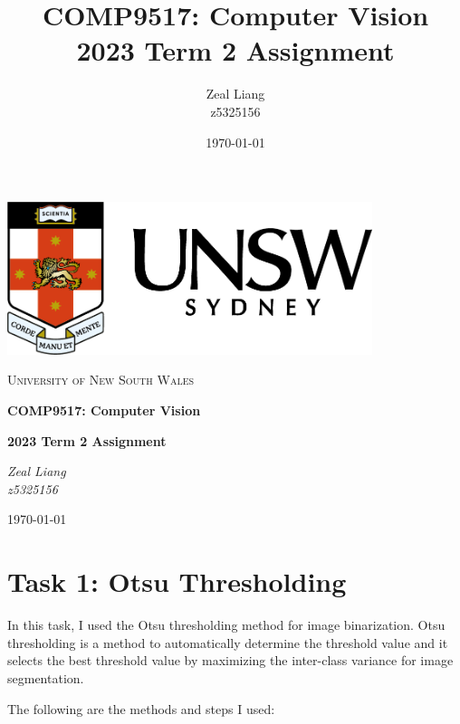 \documentclass[11pt]{report}
\title{\LARGE\bfseries\textbf{COMP9517: Computer Vision \\ 2023 Term 2 Assignment}}
\author{Zeal Liang\\z5325156}
\date{\today}
\begin{document}
\begin{titlepage}
  \centering
  \includegraphics[width=0.8\textwidth]{Sydney Landscape.png}\par\vspace{1cm}
  {\scshape\LARGE University of New South Wales \par}
  \vspace{1cm}
  {\huge\bfseries COMP9517: Computer Vision\par}
  \vspace{1cm}
  {\huge\bfseries 2023 Term 2 Assignment\par}
  \vspace{2cm}
  {\Large\itshape Zeal Liang\\z5325156\par}
  \vfill
  {\large \today\par}
\end{titlepage}



\section*{Task 1: Otsu Thresholding}

In this task, I used the Otsu thresholding method for image binarization. Otsu thresholding is a method to automatically determine the threshold value and it selects the best threshold value by maximizing the inter-class variance for image segmentation.

The following are the methods and steps I used:
\end{document}
